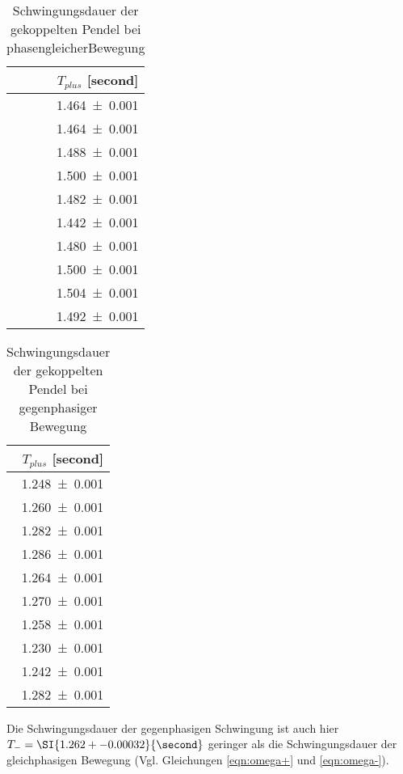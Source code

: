 \begin{table}
 \noindent
 \centering
 \caption{Schwingungsdauer der gekoppelten
 Pendel bei phasengleicherBewegung}
 \label{tab:l2t+}
 \begin{tabular}{r}
 \toprule
  {$T_{plus}$ [\si{second}]} \\
 \midrule
    \num{1.464 +- 0.001}\\
    \num{1.464 +- 0.001}\\
    \num{1.488 +- 0.001}\\
    \num{1.500 +- 0.001}\\
    \num{1.482 +- 0.001}\\
    \num{1.442 +- 0.001}\\
    \num{1.480 +- 0.001}\\
    \num{1.500 +- 0.001}\\
    \num{1.504 +- 0.001}\\
    \num{1.492 +- 0.001}\\
 \bottomrule
 \end{tabular}
\end{table}

\begin{table}
 \noindent
 \centering
 \caption{Schwingungsdauer der gekoppelten
 Pendel bei gegenphasiger Bewegung}
 \label{tab:l2t-}
 \begin{tabular}{r}
 \toprule
  {$T_{plus}$ [\si{second}]} \\
 \midrule
    \num{1.248 +- 0.001}\\
    \num{1.260 +- 0.001}\\
    \num{1.282 +- 0.001}\\
    \num{1.286 +- 0.001}\\
    \num{1.264 +- 0.001}\\
    \num{1.270 +- 0.001}\\
    \num{1.258 +- 0.001}\\
    \num{1.230 +- 0.001}\\
    \num{1.242 +- 0.001}\\
    \num{1.282 +- 0.001}\\
 \bottomrule
 \end{tabular}
\end{table}

Die Schwingungsdauer der gegenphasigen Schwingung ist auch hier
$T_-=\SI{1.262+-0.00032}{\second}$ geringer
als die Schwingungsdauer der gleichphasigen Bewegung
(Vgl. Gleichungen \ref{eqn:omega+} und \ref{eqn:omega-}).

